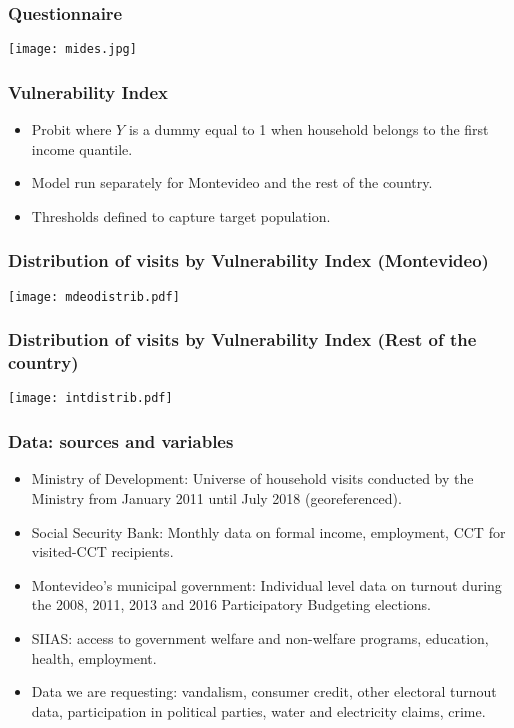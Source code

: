 \documentclass{beamer}
\begin{document}
\begin{frame}
\frametitle{Questionnaire}
\begin{center}
\texttt{[image: mides.jpg]}
\label{mides}
\end{center}
\end{frame}

\begin{frame}
\frametitle{Vulnerability Index}
\begin{itemize}
\item Probit where $Y$ is a dummy equal to 1 when household belongs to the first income quantile.
\item Model run separately for Montevideo and the rest of the country.
\item Thresholds defined to capture target population.	
\end{itemize}
\end{frame}

\begin{frame}
\frametitle{Distribution of visits by Vulnerability Index (Montevideo)}
\begin{center}
	\texttt{[image: mdeodistrib.pdf]}
	\label{mdeodistrib}
\end{center}
\end{frame}

\begin{frame}
\frametitle{Distribution of visits by Vulnerability Index (Rest of the country)}
\begin{center}
	\texttt{[image: intdistrib.pdf]}
	\label{intdistrib}
\end{center}
\end{frame}

\begin{frame}
\frametitle{Data: sources and variables}
\begin{itemize}
	\item Ministry of Development: Universe of household visits conducted by the Ministry from January 2011 until July 2018 (georeferenced).
	\item Social Security Bank: Monthly data on formal income, employment, CCT for visited-CCT recipients.
	\item Montevideo's municipal government: Individual level data on turnout during the 2008, 2011, 2013 and 2016 Participatory Budgeting elections.	
	\item SIIAS: access to government welfare and non-welfare programs, education, health, employment.
	\item {\color{gray}Data we are requesting: vandalism, consumer credit, other electoral turnout data, participation in political parties, water and electricity claims, crime.}
\end{itemize}
\end{frame}
\end{document}
